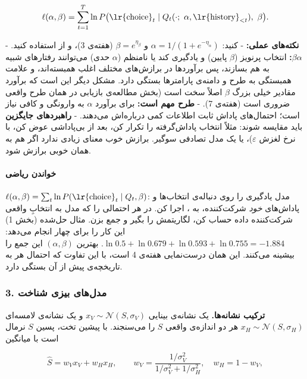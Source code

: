 \[
\ell(\alpha, \beta) = \sum_{t=1}^{T} \ln P\big(\text{\lr{choice}}_t \mid Q_t(\cdot;\ \alpha, \text{\lr{history}}_{<t}),\ \beta\big).
\]

\textbf{نکته‌های عملی:} -  کنید:
\(\alpha = 1/(1 + e^{-\eta_\alpha})\) و \(\beta = e^{\eta_\beta}\)
(هفته‌ی 3)، و از  استفاده کنید. - \textbf{
\(\alpha\)\lr{--}\(\beta\):} انتخاب پرنویز (\(\beta\) پایین) و یادگیری کند یا
نامنظم (\(\alpha\) حدی) می‌توانند رفتارهای شبیه به هم بسازند، پس برآوردها
در برازش‌های مختلف اغلب همبسته‌اند، و علامت همبستگی به طرح و دامنه‌ی
پارامترها بستگی دارد. مشکل دیگر این است که برآورد مقادیر خیلی بزرگ
\(\beta\) اصلاً سخت است (بخش  مطالعه‌ی بازیابی در همان طرح
واقعی ضروری است (هفته‌ی 7). - \textbf{طرح مهم است:} برای برآورد
\(\alpha\) به وارونگی و  کافی نیاز است؛ احتمال‌های پاداش ثابت
اطلاعات کمی درباره‌اش می‌دهند. - \textbf{راهبردهای جایگزین} باید مقایسه
شوند: مثلاً \emph{}  انتخاب پاداش‌گرفته
را تکرار کن، بعد از بی‌پاداشی عوض کن، با نرخ لغزش \(\varepsilon\))، یا یک
مدل تصادفی سوگیر. برازش خوب  معنای زیادی ندارد اگر  هم
به همان خوبی برازش شود.

\paragraph{خواندن ریاضی}

\(\ell(\alpha, \beta) = \sum_t \ln P(\text{\lr{choice}}_t \mid Q_t, \beta)\):
مدل یادگیری را روی دنباله‌ی انتخاب‌ها و پاداش‌های \emph{خود} شرکت‌کننده،
 به ، اجرا کن. در هر  احتمالی را که مدل به
انتخابِ واقعی شرکت‌کننده داده حساب کن، لگاریتمش را بگیر و جمع بزن. مثال
حل‌شده (بخش 1) این کار را برای چهار  انجام می‌دهد:
\(\ln 0.5 + \ln 0.679 + \ln 0.593 + \ln 0.755 = -1.884\). بهترین
\((\alpha, \beta)\) این جمع را بیشینه می‌کنند. این همان درست‌نمایی هفته‌ی 4
است، با این تفاوت که احتمال هر  به تاریخچه‌ی پیش از آن بستگی
دارد.

\subsubsection{3. مدل‌های بیزی شناخت}

\textbf{ترکیب نشانه‌ها.} یک نشانه‌ی بینایی
\(x_V \sim \mathcal{N}(S, \sigma_V)\) و یک نشانه‌ی لامسه‌ای
\(x_H \sim \mathcal{N}(S, \sigma_H)\) هر دو اندازه‌ی واقعی \(S\) را
می‌سنجند. با پیشین تخت، پسین \(S\) نرمال است با میانگین

\[
\hat S = w_V x_V + w_H x_H, \qquad w_V = \frac{1/\sigma_V^2}{1/\sigma_V^2 + 1/\sigma_H^2}, \quad w_H = 1 - w_V,
\]

